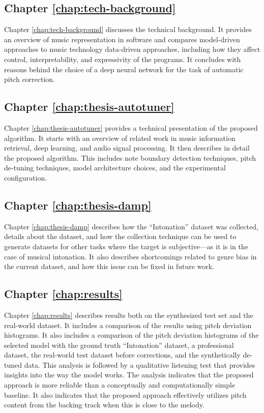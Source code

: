 \subsection{Chapter \ref{chap:tech-background}}
Chapter \ref{chap:tech-background} discusses the technical background. It provides an overview of music representation in software and compares model-driven approaches to music technology data-driven approaches, including how they affect control, interpretability, and expressivity of the programs. It concludes with reasons behind the choice of a deep neural network for the task of automatic pitch correction.

\subsection{Chapter \ref{chap:thesis-autotuner}}
Chapter \ref{chap:thesis-autotuner} provides a technical presentation of the proposed algorithm. It starts with an overview of related work in music information retrieval, deep learning, and audio signal processing. It then describes in detail the proposed algorithm. This includes note boundary detection techniques, pitch de-tuning techniques, model architecture choices, and the experimental configuration.

\subsection{Chapter \ref{chap:thesis-damp}}
Chapter \ref{chap:thesis-damp} describes how the ``Intonation'' dataset was collected, details about the dataset, and how the collection technique can be used to generate datasets for other tasks where the target is subjective---as it is in the case of musical intonation. It also describes shortcomings related to genre bias in the current dataset, and how this issue can be fixed in future work.

\subsection{Chapter \ref{chap:results}}
Chapter \ref{chap:results} describes results both on the synthesized test set and the real-world dataset. It includes a comparison of the results using pitch deviation histograms. It also includes a comparison of the pitch deviation histograms of the selected model with the ground truth ``Intonation'' dataset, a professional dataset, the real-world test dataset before corrections, and the synthetically de-tuned data. This analysis is followed by a qualitative listening test that provides insights into the way the model works. The analysis indicates that the proposed approach is more reliable than a conceptually and computationally simple baseline. It also indicates that the proposed approach effectively utilizes pitch content from the backing track when this is close to the melody.

